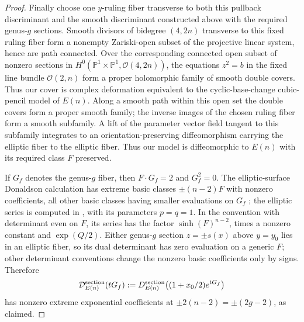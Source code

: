 \begin{proof}
Finally choose one \(y\)-ruling fiber transverse to both this pullback
discriminant and the smooth discriminant constructed above with the required
genus-\(g\) sections. Smooth divisors of bidegree \((4,2n)\) transverse to
this fixed ruling fiber form a nonempty Zariski-open subset of the projective
linear system, hence are path connected. Over the corresponding connected
open subset of nonzero sections in
$H^0(\mathbb P^1\times\mathbb P^1,\mathcal O(4,2n))$, the equations
$z^2=b$ in the fixed line bundle $\mathcal O(2,n)$ form a proper holomorphic
family of smooth double covers. Thus our cover is complex deformation
equivalent to the cyclic-base-change cubic-pencil model of $E(n)$.
Along a smooth path within this open set the double covers form a proper
smooth family; the inverse images of the
chosen ruling fiber form a smooth subfamily. A lift of the parameter vector
field tangent to this subfamily integrates to an orientation-preserving
diffeomorphism carrying the elliptic fiber to the elliptic fiber. Thus our
model is diffeomorphic to \(E(n)\) with its required class \(F\) preserved.

If $G_f$ denotes the genus-$g$ fiber, then $F\cdot G_f=2$ and
$G_f^2=0$.  The elliptic-surface Donaldson calculation has extreme basic
classes $\pm(n-2)F$ with nonzero coefficients, all other basic classes
having smaller evaluations on $G_f$
\cite{KronheimerMrowka1995}; the elliptic series is computed in
\cite[Section~6, Theorem~6.7, arXiv version~1]{FintushelStern1997},
with its parameters $p=q=1$.  In the convention with
determinant even on $F$, its series has the factor
$\sinh(F)^{n-2}$, times a nonzero constant and $\exp(Q/2)$.
Either genus-$g$ section $z=\pm s(x)$ above $y=y_0$ lies in an
elliptic fiber, so its dual determinant has zero evaluation on a
generic $F$; other determinant
conventions change the nonzero basic coefficients only by signs.
Therefore
\begin{equation}\label{eq:caps:model-series}
 \mathcal D^{\rm section}_{E(n)}(tG_f)
 :=D^{\rm section}_{E(n)}\bigl((1+x_0/2)e^{tG_f}\bigr)
\end{equation}
has nonzero extreme exponential coefficients at
$\pm2(n-2)=\pm(2g-2)$, as claimed.
\end{proof}

